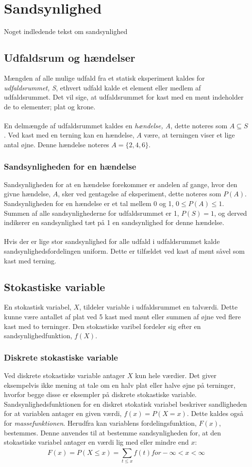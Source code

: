 \section{Sandsynlighed}
Noget indledende tekst om sandsynlighed

\subsection{Udfaldsrum og hændelser}
Mængden af alle mulige udfald fra et statisk eksperiment kaldes for \emph{udfaldsrummet,  S}, ethvert udfald kalde et element eller medlem af udfaldsrummet. Det vil sige, at udfaldsrummet for kast med en mønt indeholder de to elementer; plat og krone.
\\
\\
\noindent En delmængde af udfaldsrummet kaldes en \emph{hændelse, A}, dette noteres som $A \subseteq S$. Ved kast med en terning kan en hændelse, $A$ være, at terningen viser et lige antal øjne. Denne hændelse noteres $A=\{2,4,6\}$.


\subsubsection{Sandsynligheden for en hændelse}
Sandsynligheden for at en hændelse forekommer er andelen af gange, hvor den givne hændelse, $A$, sker ved gentagelse af eksperiment, dette noteres som $P(A)$. Sandsynligheden for en hændelse er et tal mellem 0 og 1, $0 \le P(A) \le 1$. 
Summen af alle sandsynlighederne for udfaldsrummet er 1, $P(S)=1$, og derved indikerer en sandsynlighed tæt på 1 en sandsynlighed for denne hændelse.
\\
\\
\noindent Hvis der er lige stor sandsynlighed for alle udfald i udfaldsrummet kalde sandsynlighedsfordelingen uniform. Dette er tilfældet ved kast af mønt såvel som kast med terning.


\subsection{Stokastiske variable}
En stokastisk variabel, $X$, tildeler variable i udfaldsrummet en talværdi. Dette kunne være antallet af plat ved 5 kast med mønt eller summen af øjne ved flere kast med to terninger. Den stokastiske varibel fordeler sig efter en sandsynlighedfunktion, $f(X)$.

\subsubsection{Diskrete stokastiske variable}
Ved diskrete stokastiske variable antager $X$ kun hele værdier. Det giver eksempelvis ikke mening at tale om en halv plat eller halve øjne på terninger, hvorfor begge disse er eksempler på diskrete stokastiske variable.
Sandsynlighedsfunktionen for en diskret stokatisk variabel beskriver sandligheden for at variablen antager en given værdi, $f(x)=P(X=x)$. Dette kaldes også for \emph{massefunktionen}.
Herudfra kan variablens fordelingsfunktion, $F(x)$, bestemmes. Denne anvendes til at bestemme sandsynligheden for, at den stokastiske variabel antager en værdi lig med eller mindre end $x$: $$F(x)=P(X \le x)=\sum_{t \le x}^{} f(t) for  -\infty < x < \infty$$

